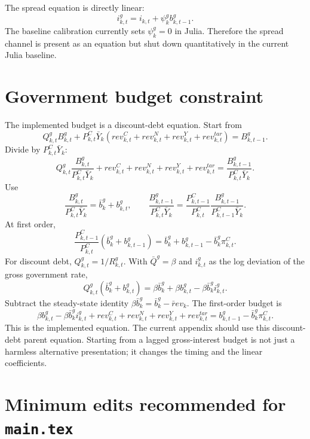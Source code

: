 \documentclass[11pt]{article}
\newcommand{\bg}{b^g}
\newcommand{\ig}{i^g}
\newcommand{\Pc}{P^C}
\begin{document}
The spread equation is directly linear:
\[
  \ig_{k,t}=i_{k,t}+\psi^g_k\bg_{k,t-1}.
\]
The baseline calibration currently sets \(\psi^g_k=0\) in Julia. Therefore the
spread channel is present as an equation but shut down quantitatively in the
current Julia baseline.

\section{Government budget constraint}

The implemented budget is a discount-debt equation. Start from
\[
  Q^g_{k,t}B^g_{k,t}
  +
  \Pc_{k,t}\bar Y_k
  \left(
    rev^C_{k,t}+rev^N_{k,t}+rev^Y_{k,t}+rev^{tar}_{k,t}
  \right)
  =
  B^g_{k,t-1}.
\]
Divide by \(\Pc_{k,t}\bar Y_k\):
\[
  Q^g_{k,t}
  \frac{B^g_{k,t}}{\Pc_{k,t}\bar Y_k}
  +rev^C_{k,t}+rev^N_{k,t}+rev^Y_{k,t}+rev^{tar}_{k,t}
  =
  \frac{B^g_{k,t-1}}{\Pc_{k,t}\bar Y_k}.
\]
Use
\[
  \frac{B^g_{k,t}}{\Pc_{k,t}\bar Y_k}=\bar b^g_k+\bg_{k,t},
  \qquad
  \frac{B^g_{k,t-1}}{\Pc_{k,t}\bar Y_k}
  =
  \frac{\Pc_{k,t-1}}{\Pc_{k,t}}
  \frac{B^g_{k,t-1}}{\Pc_{k,t-1}\bar Y_k}.
\]
At first order,
\[
  \frac{\Pc_{k,t-1}}{\Pc_{k,t}}(\bar b^g_k+\bg_{k,t-1})
  =
  \bar b^g_k+\bg_{k,t-1}-\bar b^g_k\pi^C_{k,t}.
\]
For discount debt, \(Q^g_{k,t}=1/R^g_{k,t}\). With \(\bar Q^g=\beta\) and
\(\ig_{k,t}\) as the log deviation of the gross government rate,
\[
  Q^g_{k,t}(\bar b^g_k+\bg_{k,t})
  =
  \beta\bar b^g_k+\beta\bg_{k,t}-\beta\bar b^g_k\ig_{k,t}.
\]
Subtract the steady-state identity \(\beta\bar b^g_k=\bar b^g_k-\bar rev_k\).
The first-order budget is
\[
  \beta\bg_{k,t}
  -\beta\bar b^g_k\ig_{k,t}
  +rev^C_{k,t}+rev^N_{k,t}+rev^Y_{k,t}+rev^{tar}_{k,t}
  =
  \bg_{k,t-1}
  -\bar b^g_k\pi^C_{k,t}.
\]
This is the implemented equation. The current appendix should use this
discount-debt parent equation. Starting from a lagged gross-interest budget is
not just a harmless alternative presentation; it changes the timing and the
linear coefficients.

\section{Minimum edits recommended for \texttt{main.tex}}
\end{document}
